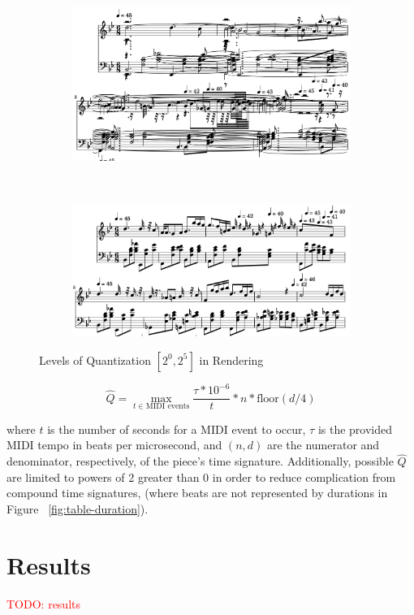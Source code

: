\documentclass[review,sigconf]{acmart}
\newcommand{\todo}[1]{\textcolor{red}{TODO: #1}}
\begin{document}
\begin{figure}
	\centering
	\begin{subfigure}
		\centering
		\includegraphics[width = .8\linewidth]{./figures/c1.png}
	\end{subfigure}
	~
	\begin{subfigure}
		\centering
		\includegraphics[width = .8\linewidth]{./figures/c32.png}
	\end{subfigure}
	\caption{Levels of Quantization $[2^0, 2^5]$ in Rendering}
	\label{fig:quantization}
\end{figure}

\begin{equation}
	\hat Q = \max_{t\in \text{MIDI events}} \frac{\tau * 10^{-6}}{t} * n * \text{floor}(d / 4)
\end{equation}

where $t$ is the number of seconds for a MIDI event to occur, $\tau$ is the provided MIDI tempo in beats per microsecond, and $(n, d)$ are the numerator and denominator, respectively, of the piece's time signature.
Additionally, possible $\hat Q$ are limited to powers of 2 greater than 0 in order to reduce complication from compound time signatures, (where beats are not represented by durations in Figure ~\ref{fig:table-duration}).


\section{Results}
\todo{results}
\end{document}
